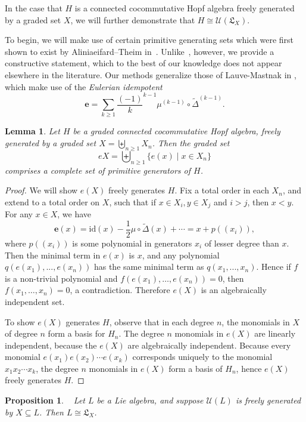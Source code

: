 \documentclass[11pt]{amsart}
\newtheorem{proposition}[theorem]{Proposition}
\newtheorem{lemma}[theorem]{Lemma}
\theoremstyle{definition}
\numberwithin{equation}{section}
\newcommand{\lucas}[1]{\todo[size=\tiny,color=red]{#1 \\ \hfill --- Lucas}}
\begin{document}
In the case that $H$ is a connected cocommutative Hopf algebra freely generated by a graded set $X$, we will further demonstrate that $H\cong \mathcal{U}(\mathfrak{L}_X).$

To begin, we will make use of certain primitive generating sets which were first shown to exist by Aliniaeifard--Theim in~\cite[Lemma 11]{AT22}.  
Unlike~\cite{AT22}, however, we provide a constructive statement, which to the best of our knowledge does not appear elsewhere in the literature.\lucas{Really double-check this}  
Our methods generalize those of Lauve-Mastnak in \cite{LM11}, which make use of the \emph{Eulerian idempotent}
\[
\mathbf{e} = \sum_{k \geq 1}\frac{(-1)}{k}^{k-1} \mu^{(k-1)} \circ \tilde{\Delta}^{(k-1)}.
\]

\begin{lemma}
\label{lemma:primitive generators}
    Let $H$ be a graded connected cocommutative Hopf algebra, freely generated by a graded set $X=\biguplus_{n \geq 1}X_n$.  Then the graded set
\[
eX = \biguplus_{n \ge 1} \{e(x) \;|\; x \in X_{n}\}
\]
comprises a complete set of primitive generators of $H$.
\end{lemma}
\begin{proof}
We will show $e(X)$ freely generates $H$. Fix a total order in each $X_n$, and extend to a total order on $X$, such that if $x\in X_i, y\in X_j$ and $i>j$, then $x<y$. For any $x\in X$, we have
\[
\mathbf{e}(x) = \text{id} (x) - \frac{1}{2}\mu \circ \tilde{\Delta}(x) + \cdots = x + p((x_i)),
\]
where $p((x_i))$ is some polynomial in generators $x_i$ of lesser degree than $x$. Then the minimal term in $e(x)$ is $x$, and any polynomial $q(e(x_1),...,e(x_n))$ has the same minimal term as $q(x_1,...,x_n)$. Hence if $f$ is a non-trivial polynomial and $f(e(x_1), \ldots, e(x_n)) = 0$, then $f(x_1, \ldots, x_n) = 0$, a contradiction. Therefore $e(X)$ is an algebraically independent set.

    To show $e(X)$ generates $H$, observe that in each degree $n$, the monomials in $X$ of degree $n$ form a basis for $H_n$. The degree $n$ monomials in $e(X)$ are linearly independent, because the $e(X)$ are algebraically independent. Because every monomial $e(x_1)e(x_2)\cdots e(x_k)$ corresponds uniquely to the monomial $x_1x_2 \cdots x_k$, the degree $n$ monomials in $e(X)$ form a basis of $H_n$, hence $e(X)$ freely generates $H$.
\end{proof}

\begin{proposition}~\cite[Prop. 2.4]{F23}
\label{prop:free primitives}
    Let $L$ be a Lie algebra, and suppose $\mathcal{U}(L)$ is freely generated by $X\subseteq L$. Then $L\cong \mathfrak{L}_X$.
\end{proposition}
\end{document}
